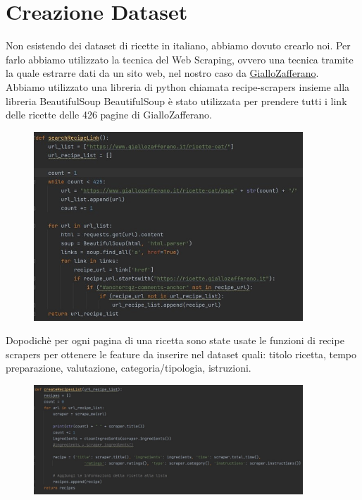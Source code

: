 \documentclass[12pt]{report}
\begin{document}
\section{Creazione Dataset}
Non esistendo dei dataset di ricette in italiano, abbiamo dovuto crearlo noi. Per farlo abbiamo utilizzato la tecnica del Web Scraping, ovvero una tecnica tramite la quale estrarre dati da un sito web, nel nostro caso da \href{https://www.giallozafferano.it/}{GialloZafferano}. 
Abbiamo utilizzato una libreria di python chiamata recipe-scrapers insieme alla libreria BeautifulSoup  
BeautifulSoup è stato utilizzata per prendere tutti i link delle ricette delle 426 pagine di GialloZafferano.
    \begin{figure}[H]
        \centering
        {\includegraphics[width=0.9\textwidth]{img/img1.jpg}}
    \end{figure}
Dopodichè  per ogni pagina di una ricetta sono state usate le funzioni di recipe scrapers per ottenere le feature da inserire nel dataset quali: titolo ricetta, tempo preparazione, valutazione, categoria/tipologia, istruzioni.
    \begin{figure}[H]
        \centering
        {\includegraphics[width=0.9\textwidth]{img/img2.jpg}}
    \end{figure}
\end{document}
